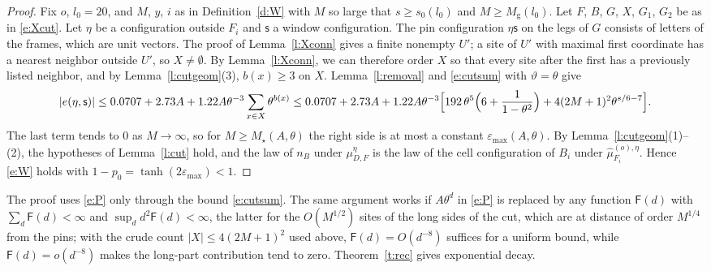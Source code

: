 \begin{proof}
Fix $o$, $l_0 = 20$, and $M$, $y$, $i$ as in Definition~\ref{d:W} with $M$ so large that $s \ge s_0(l_0)$ and $M \ge M_{\mathrm g}(l_0)$. Let $F$, $B$, $G$, $X$, $G_1$, $G_2$ be as in \eqref{e:Xcut}. Let $\eta$ be a configuration outside $F_i$ and $\mathsf s$ a window configuration. The pin configuration $\eta \mathsf s$ on the legs of $G$ consists of letters of the frames, which are unit vectors. The proof of Lemma~\ref{l:Xconn} gives a finite nonempty $U'$; a site of $U'$ with maximal first coordinate has a nearest neighbor outside $U'$, so $X\ne\emptyset$. By Lemma~\ref{l:Xconn}, we can therefore order $X$ so that every site after the first has a previously listed neighbor, and by Lemma~\ref{l:cutgeom}(3), $b(x) \ge 3$ on $X$. Lemma~\ref{l:removal} and \eqref{e:cutsum} with $\vartheta = \theta$ give
\begin{equation*}
|e(\eta, \mathsf s)| \le 0.0707 + 2.73 A + 1.22 A \theta^{-3} \sum_{x \in X} \theta^{b(x)} \le 0.0707 + 2.73 A + 1.22 A \theta^{-3} \Bigl[ 192 \, \theta^{5} \Bigl( 6 + \frac{1}{1 - \theta^2} \Bigr) + 4 (2M + 1)^2 \theta^{s/6 - 7} \Bigr].
\end{equation*}
The last term tends to $0$ as $M \to \infty$, so for $M \ge M_\star(A, \theta)$ the right side is at most a constant $\varepsilon_{\max}(A, \theta)$. By Lemma~\ref{l:cutgeom}(1)--(2), the hypotheses of Lemma~\ref{l:cut} hold, and the law of $n_B$ under $\mu^\eta_{D, F}$ is the law of the cell configuration of $B_i$ under $\hat\mu^{(o), \eta}_{F_i}$. Hence \eqref{e:W} holds with $1 - p_0 = \tanh(2 \varepsilon_{\max}) < 1$.
\end{proof}

\begin{remark}\label{r:Pweak}
The proof uses \eqref{e:P} only through the bound \eqref{e:cutsum}. The same argument works if $A \theta^d$ in \eqref{e:P} is replaced by any function $\mathsf F(d)$ with $\sum_d \mathsf F(d) < \infty$ and $\sup_d d^2 \mathsf F(d) < \infty$, the latter for the $O(M^{1/2})$ sites of the long sides of the cut, which are at distance of order $M^{1/4}$ from the pins; with the crude count $|X|\le4(2M+1)^2$ used above, $\mathsf F(d)=O(d^{-8})$ suffices for a uniform bound, while $\mathsf F(d)=o(d^{-8})$ makes the long-part contribution tend to zero. Theorem~\ref{t:rec} gives exponential decay.
\end{remark}

